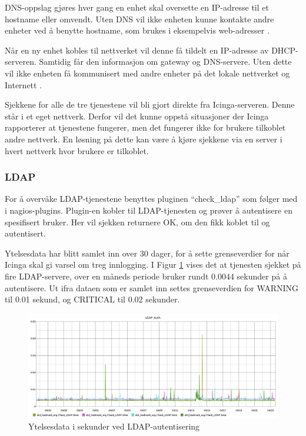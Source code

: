 DNS-oppslag gjøres hver gang en enhet skal oversette en IP-adresse til et hostname eller omvendt. Uten DNS vil ikke enheten kunne kontakte andre enheter ved å benytte hostname, som brukes i eksempelvis web-adresser \cite{dns}. 

Når en ny enhet kobles til nettverket vil denne få tildelt en IP-adresse av DHCP-serveren. Samtidig får den informasjon om gateway og DNS-servere. Uten dette vil ikke enheten få kommunisert med andre enheter på det lokale nettverket og Internett \cite{dhcp}.

Sjekkene for alle de tre tjenestene vil bli gjort direkte fra Icinga-serveren. Denne står i et eget nettverk. Derfor vil det kunne oppstå situasjoner der Icinga rapporterer at tjenestene fungerer, men det fungerer ikke for brukere tilkoblet andre nettverk. En løsning på dette kan være å kjøre sjekkene via en server i hvert nettverk hvor brukere er tilkoblet.

\subsubsection*{LDAP}
For å overvåke LDAP-tjenestene benyttes pluginen ``check\_ldap'' som følger med i nagios-plugins. Plugin-en kobler til LDAP-tjenesten og prøver å autentisere en spesifisert bruker. Her vil sjekken returnere OK, om den fikk koblet til og autentisert. 

Ytelsesdata har blitt samlet inn over 30 dager, for å sette grenseverdier for når Icinga skal gi varsel om treg innlogging. I Figur \ref{ldapauth-inv} vises det at tjenesten sjekket på fire LDAP-servere, over en måneds periode bruker rundt 0.0044 sekunder på å autentisere. Ut ifra dataen som er samlet inn settes grenseverdien for WARNING til 0.01 sekund, og CRITICAL til 0.02 sekunder.

\begin{figure}[H]
    \centering
    \includegraphics[width=1.0\textwidth]{img/ldap-auth-inv}
    \caption{Ytelsesdata i sekunder ved LDAP-autentisering}
    \label{ldapauth-inv}
\end{figure}

